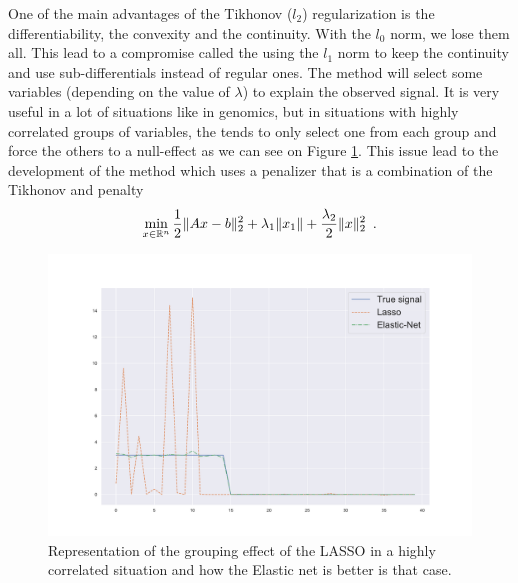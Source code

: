 \documentclass{article}
\begin{document}
One of the main advantages of the Tikhonov ($l_2$) regularization is the differentiability, the convexity and the continuity. With the $l_0$ norm, we lose them all. This lead to a compromise called the \lasso using the $l_1$ norm to keep the continuity and use sub-differentials instead of regular ones. The \lasso method will select some variables (depending on the value of $\lambda$) to explain the observed signal. It is very useful in a lot of situations like in genomics, but in situations with highly correlated groups of variables, the \lasso tends to only select one from each group and force the others to a null-effect as we can see on Figure \ref{fig:lasso_enet}. This issue lead to the development of the \enet method which uses a penalizer that is a combination of the Tikhonov and \lasso penalty
\[\min_{x\in\mathbb{R}^n} \frac{1}{2}\|Ax-b\|^2_2 + \lambda_1 \|x_1\| +  \frac{\lambda_2}{2}\|x\|^2_2\enspace.\]

\begin{center}
    \begin{figure}
        \centering
        \includegraphics[width=.9\linewidth]{Lasso_enet.pdf}
        \caption{Representation of the grouping effect of the LASSO in a highly correlated situation and how the Elastic net is better is that case.}
        \label{fig:lasso_enet}
    \end{figure}
\end{center}
\end{document}
